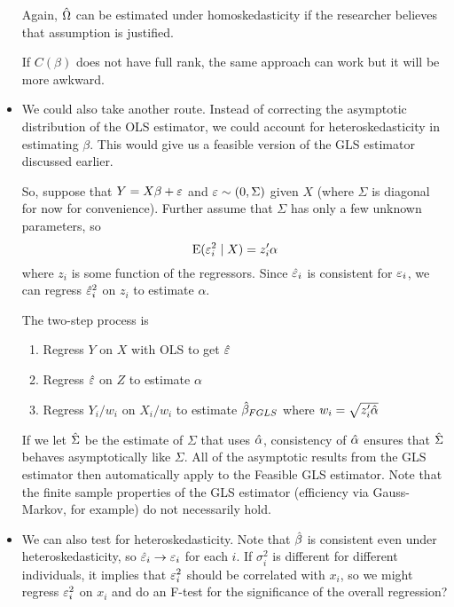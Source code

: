 \begin{itemize}[leftmargin=0pt]
  Again, $\hat{\Omega}$ can be estimated under homoskedasticity if the
  researcher believes that assumption is justified.

  If $C(\beta)$ does not have full rank, the same approach can work but it
  will be more awkward.

\item We could also take another route.  Instead of correcting the
  asymptotic distribution of the OLS estimator, we could account for
  heteroskedasticity in estimating $\beta$.  This would give us a feasible
  version of the GLS estimator discussed earlier.

  So, suppose that $Y = X \beta + \varepsilon$ and $\varepsilon \sim (0, \Sigma)$ given $X$ (where
  $\Sigma$ is diagonal for now for convenience).
  Further assume that $\Sigma$ has only a few unknown parameters,
  so
  \begin{equation*}
    \operatorname{E}(\varepsilon^2_i \mid X) = z_i'\alpha
  \end{equation*}
  where $z_i$ is some function of the regressors.  Since $\hat{\varepsilon}_i$ is
  consistent for $\varepsilon_i$, we can regress $\hat{\varepsilon}^2_i$ on $z_i$ to
  estimate $\alpha$.

  The two-step process is
  \begin{enumerate}
  \item Regress $Y$ on $X$ with OLS to get $\hat{\varepsilon}$
  \item Regress $\hat{\varepsilon}$ on $Z$ to estimate $\alpha$
  \item Regress $Y_i/w_i$ on $X_i/w_i$ to estimate $\hat{\beta}_{FGLS}$ where
    $w_i = \sqrt{z_i'\hat{\alpha}}$
  \end{enumerate}

  If we let $\hat{\Sigma}$ be the estimate of $\Sigma$ that uses $\hat{\alpha}$, consistency
  of $\hat{\alpha}$ ensures that $\hat{\Sigma}$ behaves asymptotically like $\Sigma$.  All of
  the asymptotic results from the GLS estimator then automatically
  apply to the Feasible GLS estimator.  Note that the finite sample
  properties of the GLS estimator (efficiency via Gauss-Markov, for
  example) do not necessarily hold.

\item We can also test for heteroskedasticity.  Note that $\hat{\beta}$ is
  consistent even under heteroskedasticity, so $\hat{\varepsilon}_i \to \varepsilon_i$ for
  each $i$.  If $\sigma^2_i$ is different for different individuals, it
  implies that $\varepsilon^2_i$ should be correlated with $x_i$, so we might
  regress $\varepsilon^2_i$ on $x_i$ and do an F-test for the significance of
  the overall regression?


\end{itemize}

